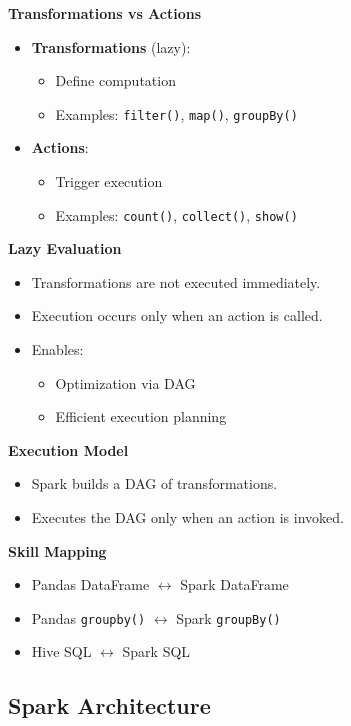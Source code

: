 \documentclass[10pt,a4paper]{article}
\begin{document}
	\textbf{Transformations vs Actions}
	\begin{itemize}
	    \item \textbf{Transformations} (lazy):
	    \begin{itemize}
	        \item Define computation
	        \item Examples: \texttt{filter()}, \texttt{map()}, \texttt{groupBy()}
	    \end{itemize}
	    
	    \item \textbf{Actions}:
	    \begin{itemize}
	        \item Trigger execution
	        \item Examples: \texttt{count()}, \texttt{collect()}, \texttt{show()}
	    \end{itemize}
	\end{itemize}
	
	\textbf{Lazy Evaluation}
	\begin{itemize}
	    \item Transformations are not executed immediately.
	    \item Execution occurs only when an action is called.
	    \item Enables:
	    \begin{itemize}
	        \item Optimization via DAG
	        \item Efficient execution planning
	    \end{itemize}
	\end{itemize}
	
	\textbf{Execution Model}
	\begin{itemize}
	    \item Spark builds a DAG of transformations.
	    \item Executes the DAG only when an action is invoked.
	\end{itemize}
	
	\textbf{Skill Mapping}
	\begin{itemize}
	    \item Pandas DataFrame $\leftrightarrow$ Spark DataFrame
	    \item Pandas \texttt{groupby()} $\leftrightarrow$ Spark \texttt{groupBy()}
	    \item Hive SQL $\leftrightarrow$ Spark SQL
	\end{itemize}

	\subsection{Spark Architecture}
	
\end{document}
